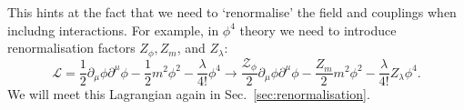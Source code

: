 This hints at the fact that we need to `renormalise' the field and couplings when includng interactions. For example, in $\phi^4$ theory we need to introduce renormalisation factors $Z_\phi, Z_m$, and $Z_\lambda$:
\begin{equation}
  \mathscr{L} = \frac{1}{2} \partial_{\mu} \phi \partial^{\mu} \phi - \frac{1}{2} m^2 \phi^2 - \frac{\lambda}{4!} \phi^4 \to 
  \frac{\mathcal{Z}_\phi}{2} \partial_{\mu} \phi \partial^{\mu} \phi - \frac{Z_m}{2} m^2 \phi^2 - \frac{\lambda}{4!} Z_\lambda \phi^4.
\end{equation}
We will meet this Lagrangian again in Sec.~\ref{sec:renormalisation}.
